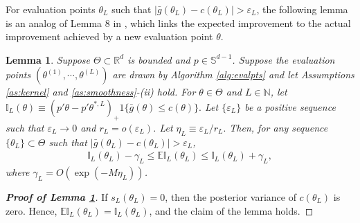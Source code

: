 \documentclass[letterpaper,11pt]{article}
\theoremstyle{myplain}
\newtheorem{lemma}{Lemma}[section]
\theoremstyle{mydefinition}
\theoremstyle{myremark}
\renewcommand{\cite}{\citet}
\newcommand{\EI}{\mathbb{EI}}
\numberwithin{equation}{section}
\numberwithin{figure}{section}
\begin{document}
\begin{appendix}
For evaluation points $\theta_L$ such that $|\bar g(\theta_L)-c(\theta_L)|>\varepsilon_L$, the following lemma is an analog of Lemma 8 in \cite{Bull_Convergence_2011}, which links the expected improvement to the actual improvement achieved by a new evaluation point $\theta$.
\begin{lemma}\label{lem:bds2}Suppose $\Theta\subset\mathbb R^d$ is bounded and $p\in \mathbb S^{d-1}$.
Suppose the evaluation points $(\theta^{(1)},\cdots,\theta^{(L)})$ are drawn by Algorithm \ref{alg:evalpts} and let Assumptions \ref{as:kernel} and \ref{as:smoothness}-(ii) hold.
For $\theta\in\Theta$ and $L\in\mathbb N$, let $\mathbb{I}_L(\theta)\equiv (p'\theta-p'\theta^{*,L})_+1\{\bar g(\theta)\le c(\theta)\}.$
Let $\{\varepsilon_L\}$ be a positive sequence such that $\varepsilon_L\to 0$ and $r_L=o(\varepsilon_L)$. Let $\eta_L\equiv\varepsilon_L/r_L.$
 Then, for any sequence $\{\theta_L\}\subset\Theta$ such that $|\bar g(\theta_L)-c(\theta_L)|>\varepsilon_L$,
\begin{align}
\mathbb{I}_L(\theta_L)-\gamma_L\le \EI_L(\theta_L)\le \mathbb{I}_L(\theta_L)+\gamma_L,\label{eq:lembds1}
\end{align}
 where $\gamma_L=O(\exp(-M\eta_L))$.
\end{lemma}

\begin{proof}[\rm \textbf{Proof of Lemma \ref{lem:bds2}}]
If $s_L(\theta_L)=0$, then the posterior variance of $c(\theta_L)$ is zero. Hence, $\EI_L(\theta_L)=\mathbb{I}_L(\theta_L)$, and the claim of the lemma holds.


\end{proof}
\end{appendix}
\end{document}
